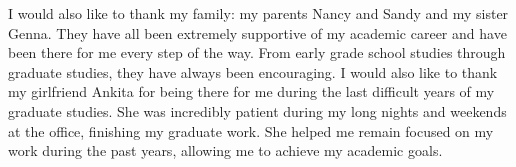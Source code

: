 I would also like to thank my family: my parents Nancy and Sandy and my sister Genna. They have all been extremely supportive of my academic career and have been there for me every step of the way. From early grade school studies through graduate studies, they have always been encouraging. I would also like to thank my girlfriend Ankita for being there for me during the last difficult years of my graduate studies. She was incredibly patient during my long nights and weekends at the office, finishing my graduate work. She helped me remain focused on my work during the past years, allowing me to achieve my academic goals.
